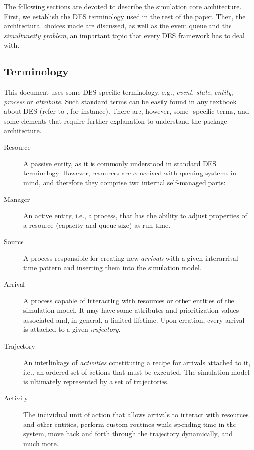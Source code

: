 \documentclass[
  nojss]{jss}
\providecommand{\tightlist}{%
  \setlength{\itemsep}{0pt}\setlength{\parskip}{0pt}}
\begin{document}
The following sections are devoted to describe the simulation core
architecture. First, we establish the DES terminology used in the rest
of the paper. Then, the architectural choices made are discussed, as
well as the event queue and the \emph{simultaneity problem}, an
important topic that every DES framework has to deal with.

\hypertarget{terminology}{%
\subsection{Terminology}\label{terminology}}

This document uses some DES-specific terminology, e.g., \emph{event},
\emph{state}, \emph{entity}, \emph{process} or \emph{attribute}. Such
standard terms can be easily found in any textbook about DES (refer to
\citet{Banks:2005:Discrete}, for instance). There are, however, some
-specific terms, and some elements that require further
explanation to understand the package architecture.

\begin{description}
\item[Resource]
A passive entity, as it is commonly understood in standard DES
terminology. However,  resources are conceived with queuing
systems in mind, and therefore they comprise two internal self-managed
parts:

\item[Manager]
An active entity, i.e., a process, that has the ability to adjust
properties of a resource (capacity and queue size) at run-time.
\item[Source]
A process responsible for creating new \emph{arrivals} with a given
interarrival time pattern and inserting them into the simulation model.
\item[Arrival]
A process capable of interacting with resources or other entities of the
simulation model. It may have some attributes and prioritization values
associated and, in general, a limited lifetime. Upon creation, every
arrival is attached to a given \emph{trajectory}.
\item[Trajectory]
An interlinkage of \emph{activities} constituting a recipe for arrivals
attached to it, i.e., an ordered set of actions that must be executed.
The simulation model is ultimately represented by a set of trajectories.
\item[Activity]
The individual unit of action that allows arrivals to interact with
resources and other entities, perform custom routines while spending
time in the system, move back and forth through the trajectory
dynamically, and much more.
\end{description}
\end{document}
